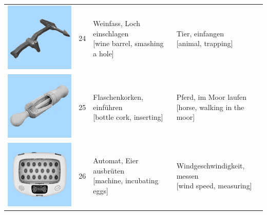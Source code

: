 \documentclass[
  english,
  man,floatsintext]{apa7}
\begin{document}
\begin{center}
\begin{ThreePartTable}
{\begin{longtable}{llll}
\includegraphics[valign=c, scale=0.23]{../materials/unfamiliar/24.png} & 24 & \makecell[l]{Weinfass, Loch einschlagen\\{[wine barrel, smashing a hole]}} & \makecell[l]{Tier, einfangen\\{[animal, trapping]}}\\
\includegraphics[valign=c, scale=0.23]{../materials/unfamiliar/25.png} & 25 & \makecell[l]{Flaschenkorken, einführen\\{[bottle cork, inserting]}} & \makecell[l]{Pferd, im Moor laufen\\{[horse, walking in the moor]}}\\
\includegraphics[valign=c, scale=0.23]{../materials/unfamiliar/26.png} & 26 & \makecell[l]{Automat, Eier ausbrüten\\{[machine, incubating eggs]}} & \makecell[l]{Windgeschwindigkeit, messen\\{[wind speed, measuring]}}\\

\end{longtable}}
\end{ThreePartTable}
\end{center}
\end{document}
